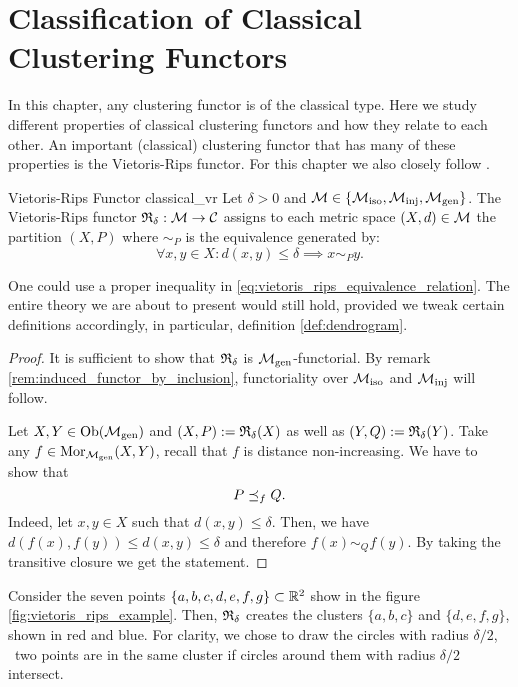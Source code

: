 \chapter{Classification of Classical Clustering Functors}
\label{chapter__classical}
In this chapter, any clustering functor is of the classical type.
Here we study different properties of classical clustering functors and how they relate to each other.
An important (classical) clustering functor that has many of these properties is the Vietoris-Rips functor. For this chapter we also closely follow \cite{Carlsson2010}.

\begin{defprop}{Vietoris-Rips Functor \cite[Def.~6.1]{Carlsson2010}}{classical_vr}
    Let $\delta > 0$ and $\mathcal{M} \in \{{\mathcal{M}_\mathrm{iso}}, {\mathcal{M}_\mathrm{inj}}, {\mathcal{M}_\mathrm{gen}}\}$. The Vietoris-Rips functor $\mathfrak{R}_\delta: \mathcal{M} \to \mathcal{C}$ assigns to each metric space $(X,d) \in \mathcal{M}$ the partition $(X,P)$ where $\sim_P$ is the equivalence generated by:
    \begin{equation}
        \label{eq:vietoris_rips_equivalence_relation}
        \forall x,y \in X: d(x,y) \leq \delta \implies x \sim_P y.
    \end{equation}
\end{defprop}

One could use a proper inequality in \eqref{eq:vietoris_rips_equivalence_relation}. The entire theory we are about to present would still hold, provided we tweak certain definitions accordingly, in particular, definition \ref{def:dendrogram}.

\begin{proof}
It is sufficient to show that $\mathfrak{R}_\delta$ is ${\mathcal{M}_\mathrm{gen}}$-functorial. By remark \ref{rem:induced_functor_by_inclusion}, functoriality over ${\mathcal{M}_\mathrm{iso}}$ and ${\mathcal{M}_\mathrm{inj}}$ will follow.

Let $X,Y \in \mathrm {Ob}({\mathcal{M}_\mathrm{gen}})$ and $(X,P) := \mathfrak{R}_\delta(X)$ as well as $(Y,Q) := \mathfrak{R}_\delta(Y)$.
Take any $f \in \mathrm {Mor}_{\mathcal{M}_\mathrm{gen}}(X,Y)$, recall that $f$ is distance non-increasing.
We have to show that 
$$P \preceq_f Q.$$
Indeed, let $x,y \in X$ such that $d(x,y) \leq \delta$.
Then, we have $d(f(x), f(y)) \leq d(x,y) \leq \delta$ and therefore $f(x) \sim_{Q} f(y)$.
By taking the transitive closure we get the statement.
\end{proof}

Consider the seven points $\{a,b,c,d,e,f,g\} \subset \mathbb R^2$ show in the figure \ref{fig:vietoris_rips_example}. Then, $\mathfrak{R}_\delta$ creates the clusters $\{a,b,c\}$ and $\{d,e,f,g\}$, shown in red and blue. For clarity, we chose to draw the circles with radius $\delta / 2$, \ie\ two points are in the same cluster if circles around them with radius $\delta / 2$ intersect.

